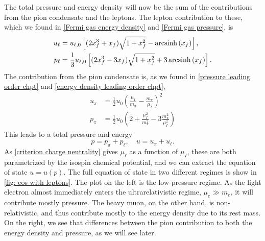 The total pressure and energy density will now be the sum of the contributions from the pion condensate and the leptons.
The lepton contribution to these, which we found in \autoref{Fermi gas energy density} and \autoref{Fermi gas pressure}, is
%
\begin{align}
    u_\ell 
    &= u_{\ell,0} 
    \left[(2x_f^3 + x_f) \sqrt{1 + x_f^2} - \operatorname{arcsinh}\left(x_f\right)\right], \\
    p_\ell
    &=\frac{1}{3} u_{\ell,0}
    \left[(2x_f^3 - 3x_f) \sqrt{1 + x_f^2} + 3\operatorname{arcsinh}\left(x_f\right)\right].
\end{align}
%
The contribution from the pion condensate is, as we found in \autoref{pressure leading order chpt} and \autoref{energy density leading order chpt},
%
\begin{align}
    u_\pi &= \frac{1}{2} u_0 \left( \frac{\mu_I}{m_\pi} - \frac{m_\pi}{\mu_I}\right)^2 \\
    p_\pi &= \frac{1}{2} u_0 \left( 2 + \frac{\mu_I^2}{m_\pi^2} - 3 \frac{m_\pi^2}{\mu_I^2}  \right)
\end{align}
%
This leads to a total pressure and energy
%
\begin{equation}
    p = p_\pi + p_\ell, \quad u = u_\pi + u_\ell.
\end{equation}
%
As \autoref{criterion charge neutrality} gives $\mu_\ell$ as a function of $\mu_I$, these are both parametrized by the isospin chemical potential, and we can extract the equation of state $u = u(p)$.
The full equation of state in two different regimes is show in \autoref{fig: eos with leptons}.
The plot on the left is the low-pressure regime.
As the light electron almost immediately enters the ultrarelativistic regime, $\mu_e\gg m_e$, it will contribute mostly pressure.
The heavy muon, on the other hand, is non-relativistic, and thus contribute mostly to the energy density due to its rest mass.
On the right, we see that differences between the pion contribution to both the energy density and pressure, as we will see later.

